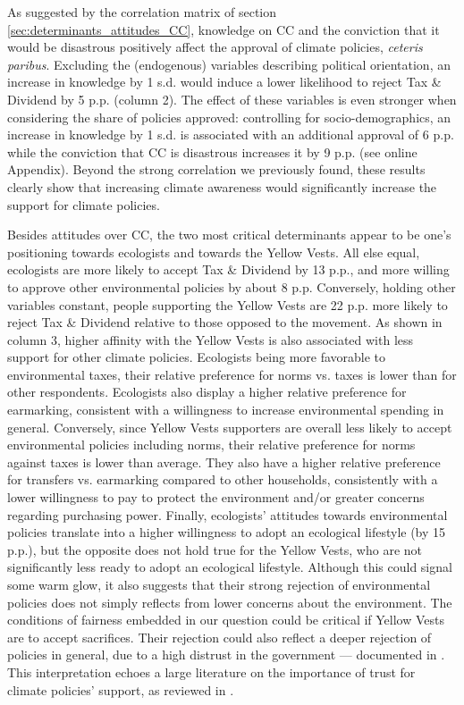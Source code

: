 \documentclass[english,5p,authoryear]{elsarticle}
\begin{document}
As suggested by the correlation matrix of section \ref{sec:determinants_attitudes_CC}, knowledge on CC and the conviction that it would be disastrous positively affect the approval of climate policies, \textit{ceteris paribus}. Excluding the (endogenous) variables describing political orientation, an increase in knowledge by 1 s.d. would induce a lower likelihood to reject Tax \& Dividend by 5 p.p. (column 2). The effect of these variables is even stronger when considering the share of policies approved: controlling for socio-demographics, an increase in knowledge by 1 s.d. is associated with an additional approval of 6 p.p. while the conviction that CC is disastrous increases it by 9 p.p. (see online Appendix). Beyond the strong correlation we previously found, these results clearly show that increasing climate awareness would significantly increase the support for climate policies.

Besides attitudes over CC, the two most critical determinants appear to be one's positioning towards ecologists and towards the Yellow Vests. All else equal, ecologists are more likely to accept Tax \& Dividend by 13 p.p., and more willing to approve other environmental policies by about 8 p.p. Conversely, holding other variables constant, people supporting the Yellow Vests are 22 p.p. more likely to reject Tax \& Dividend relative to those opposed to the movement. As shown in column 3, higher affinity with the Yellow Vests is also associated with less support for other climate policies. Ecologists being more favorable to environmental taxes, their relative preference for norms vs. taxes is lower than for other respondents. Ecologists also display a higher relative preference for earmarking, consistent with a willingness to increase environmental spending in general. Conversely, since Yellow Vests supporters are overall less likely to accept environmental policies including norms, their relative preference for norms against taxes is lower than average. They also have a higher relative preference for transfers vs. earmarking compared to other households, consistently with a lower willingness to pay to protect the environment and/or greater concerns regarding purchasing power. Finally, ecologists' attitudes towards environmental policies translate into a higher willingness to adopt an ecological lifestyle (by 15 p.p.), but the opposite does not hold true for the Yellow Vests, who are not significantly less ready to adopt an ecological lifestyle. Although this could signal some warm glow, it also suggests that their strong rejection of environmental policies does not simply reflects from lower concerns about the environment. The conditions of fairness embedded in our question could be critical if Yellow Vests are to accept sacrifices. Their rejection could also reflect a deeper rejection of policies in general, due to a high distrust in the government --- documented in \citet{algan_et_al_19}. This interpretation echoes a large literature on the importance of trust for climate policies' support, as reviewed in \citet{drews_van_der_bergh_2016}. %
\end{document}
